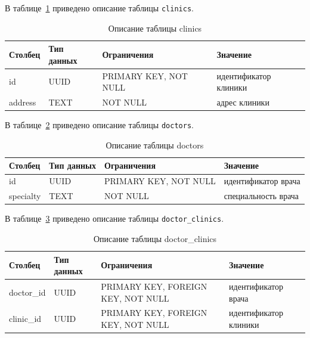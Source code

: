 В таблице~\ref{tab:clinics-design} приведено описание таблицы \texttt{clinics}.

\begin{table}[H]
	\caption{Описание таблицы clinics}
	\label{tab:clinics-design}
	\centering
	\begin{tabular}{|p{}|p{}|p{}|p{}|}
		\hline
		Столбец & Тип данных & Ограничения & Значение \\
		\hline
		id & UUID & PRIMARY KEY, NOT NULL & идентификатор клиники \\
		\hline
		address & TEXT & NOT NULL & адрес клиники \\
		\hline
	\end{tabular}
\end{table}

В таблице~\ref{tab:doctors-design} приведено описание таблицы \texttt{doctors}.

\begin{table}[H]
	\caption{Описание таблицы doctors}
	\label{tab:doctors-design}
	\centering
	\begin{tabular}{|p{}|p{}|p{}|p{}|}
		\hline
		Столбец & Тип данных & Ограничения & Значение \\
		\hline
		id & UUID & PRIMARY KEY, NOT NULL & идентификатор врача \\
		\hline
		specialty & TEXT & NOT NULL & специальность врача \\
		\hline
	\end{tabular}
\end{table}

В таблице~\ref{tab:doctor-clinics-design} приведено описание таблицы \texttt{doctor\_clinics}.

\begin{table}[H]
	\caption{Описание таблицы doctor\_clinics}
	\label{tab:doctor-clinics-design}
	\centering
	\begin{tabular}{|p{}|p{}|p{}|p{}|}
		\hline
		Столбец & Тип данных & Ограничения & Значение \\
		\hline
		doctor\_id & UUID & PRIMARY KEY, FOREIGN KEY, NOT NULL & идентификатор врача \\
		\hline
		clinic\_id & UUID & PRIMARY KEY, FOREIGN KEY, NOT NULL & идентификатор клиники \\
		\hline
	\end{tabular}
\end{table}

